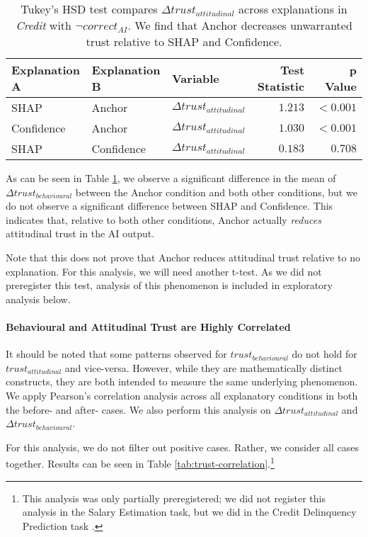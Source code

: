 \begin{table}[htb]
    \centering
    \caption{Tukey's HSD test compares $\Delta trust_{attitudinal}$ across explanations in \emph{Credit} with $\neg correct_{AI}$. We find that Anchor decreases unwarranted trust relative to SHAP and Confidence.}
    \label{tab:delta-trust-hsd-2}
    \begin{tabular}{lllrr}
        \toprule
        Explanation A & Explanation B & Variable & Test Statistic & p Value \\
        \midrule
        SHAP & Anchor & $\Delta trust_{attitudinal}$ & $\mathbf{1.213}$ & $\mathbf{<0.001}$ \\
        Confidence & Anchor & $\Delta trust_{attitudinal}$ & $\mathbf{1.030}$ & $\mathbf{<0.001}$ \\
        SHAP & Confidence & $\Delta trust_{attitudinal}$ & $0.183$ & $0.708$ \\
        \bottomrule
    \end{tabular}
\end{table}

As can be seen in Table \ref{tab:delta-trust-hsd-2}, we observe a significant difference in the mean of $\Delta trust_{behavioural}$ between the Anchor condition and both other conditions, but we do not observe a significant difference between SHAP and Confidence. This indicates that, relative to both other conditions, Anchor actually \emph{reduces} attitudinal trust in the AI output.

Note that this does not prove that Anchor reduces attitudinal trust relative to no explanation. For this analysis, we will need another t-test. As we did not preregister this test, analysis of this phenomenon is included in exploratory analysis below.

\paragraph{Behavioural and Attitudinal Trust are Highly Correlated}
It should be noted that some patterns observed for $trust_{behavioural}$ do not hold for $trust_{attitudinal}$ and vice-versa. However, while they are mathematically distinct constructs, they are both intended to measure the same underlying phenomenon. We apply Pearson's correlation analysis across all explanatory conditions in both the before- and after- cases. We also perform this analysis on $\Delta trust_{attitudinal}$ and $\Delta trust_{behavioural}$. 

For this analysis, we do not filter out positive cases. Rather, we consider all cases together. Results can be seen in Table \ref{tab:trust-correlation}.\footnote{This analysis was only partially preregistered; we did not register this analysis in the Salary Estimation task, but we did in the Credit Delinquency Prediction task \cite{natarajan_binns_2022}.}

